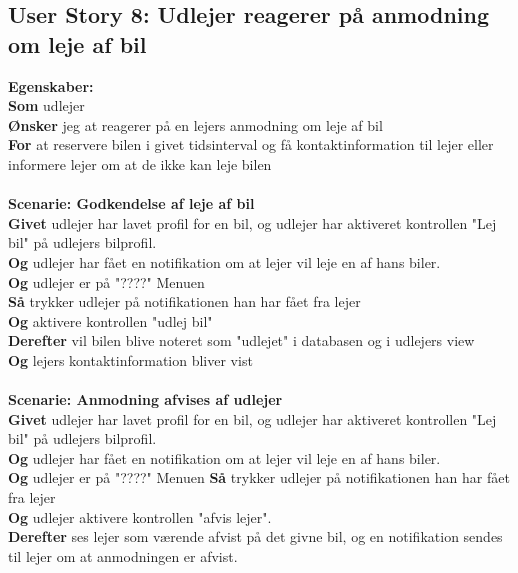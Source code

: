 \documentclass[Kravspecifikation/Kravspec_Main.tex]{subfiles}
\begin{document}
\subsection{User Story 8: Udlejer reagerer på anmodning om leje af bil}
\textbf{Egenskaber:} \\
\textbf{Som} udlejer\\
\textbf{Ønsker} jeg at reagerer på en lejers anmodning om leje af bil \\
\textbf{For} at reservere bilen i givet tidsinterval og få kontaktinformation til lejer eller informere lejer om at de ikke kan leje bilen
\\\\ 
\textbf{Scenarie: Godkendelse af leje af bil} \\
\textbf{Givet} udlejer har lavet profil for en bil, og udlejer har aktiveret kontrollen "Lej bil" på udlejers bilprofil. \\
\textbf{Og} udlejer har fået en notifikation om at lejer vil leje en af hans biler.\\
\textbf{Og} udlejer er på "????" Menuen \\
\textbf{Så} trykker udlejer på notifikationen han har fået fra lejer \\
\textbf{Og} aktivere kontrollen "udlej bil" \\
\textbf{Derefter} vil bilen blive noteret som "udlejet" i databasen og i udlejers view \\
\textbf{Og} lejers kontaktinformation bliver vist
\\\\
\textbf{Scenarie: Anmodning afvises af udlejer}\\
\textbf{Givet} udlejer har lavet profil for en bil, og udlejer har aktiveret kontrollen "Lej bil" på udlejers bilprofil. \\
\textbf{Og} udlejer har fået en notifikation om at lejer vil leje en af hans biler.\\
\textbf{Og} udlejer er på "????" Menuen
\textbf{Så} trykker udlejer på notifikationen han har fået fra lejer \\
\textbf{Og} udlejer aktivere kontrollen "afvis lejer".\\
\textbf{Derefter} ses lejer som værende afvist på det givne bil, og en notifikation sendes til lejer om at anmodningen er afvist.
\end{document}
